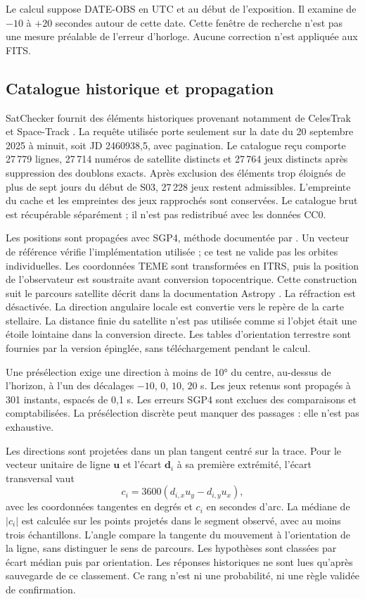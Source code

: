 \documentclass[11pt,letterpaper]{article}
\begin{document}
Le calcul suppose DATE-OBS en UTC et au début de l’exposition.
Il examine de $-10$ à $+20$ secondes autour de cette date.
Cette fenêtre de recherche n’est pas une mesure préalable de l’erreur d’horloge.
Aucune correction n’est appliquée aux FITS.

\subsection{Catalogue historique et propagation}
SatChecker fournit des éléments historiques provenant notamment de CelesTrak et Space-Track \parencite{satchecker}.
La requête utilisée porte seulement sur la date du 20 septembre 2025 à minuit, soit JD 2460938,5, avec pagination.
Le catalogue reçu comporte 27\,779 lignes, 27\,714 numéros de satellite distincts et 27\,764 jeux distincts après suppression des doublons exacts.
Après exclusion des éléments trop éloignés de plus de sept jours du début de S03, 27\,228 jeux restent admissibles.
L’empreinte du cache et les empreintes des jeux rapprochés sont conservées.
Le catalogue brut est récupérable séparément ; il n’est pas redistribué avec les données CC0.

Les positions sont propagées avec SGP4, méthode documentée par \textcite{vallado}.
Un vecteur de référence vérifie l’implémentation utilisée ; ce test ne valide pas les orbites individuelles.
Les coordonnées TEME sont transformées en ITRS, puis la position de l’observateur est soustraite avant conversion topocentrique.
Cette construction suit le parcours satellite décrit dans la documentation Astropy \parencite{astropy}.
La réfraction est désactivée. La direction angulaire locale est convertie vers le repère de la carte stellaire.
La distance finie du satellite n’est pas utilisée comme si l’objet était une étoile lointaine dans la conversion directe.
Les tables d’orientation terrestre sont fournies par la version épinglée, sans téléchargement pendant le calcul.

Une présélection exige une direction à moins de 10° du centre, au-dessus de l’horizon, à l’un des décalages $-10$, $0$, $10$, $20$ s.
Les jeux retenus sont propagés à 301 instants, espacés de 0,1 s.
Les erreurs SGP4 sont exclues des comparaisons et comptabilisées.
La présélection discrète peut manquer des passages : elle n’est pas exhaustive.

Les directions sont projetées dans un plan tangent centré sur la trace.
Pour le vecteur unitaire de ligne $\mathbf{u}$ et l’écart $\mathbf{d}_i$ à sa première extrémité, l’écart transversal vaut
\begin{equation}
 c_i=3600(d_{i,x}u_y-d_{i,y}u_x),
\end{equation}
avec les coordonnées tangentes en degrés et $c_i$ en secondes d’arc.
La médiane de $|c_i|$ est calculée sur les points projetés dans le segment observé, avec au moins trois échantillons.
L’angle compare la tangente du mouvement à l’orientation de la ligne, sans distinguer le sens de parcours.
Les hypothèses sont classées par écart médian puis par orientation.
Les réponses historiques ne sont lues qu’après sauvegarde de ce classement.
Ce rang n’est ni une probabilité, ni une règle validée de confirmation.
\end{document}
